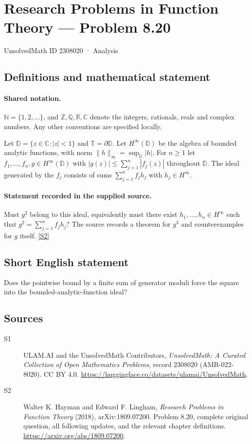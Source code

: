 \documentclass[11pt]{book}
\newcommand{\sref}[2]{\hyperlink{source:#1:#2}{[S#2]}}
\begin{document}
\setcounter{section}{2308019}
\section{Research Problems in Function Theory — Problem 8.20}\label{2308020}
{\small\sffamily UnsolvedMath ID 2308020 · Analysis}
\subsection{Definitions and mathematical statement}

\paragraph{Shared notation.}$\mathbb N=\{1,2,\ldots\}$, and $\mathbb Z,\mathbb Q,\mathbb R,\mathbb C$ denote the integers, rationals, reals and complex numbers. Any other conventions are specified locally.


Let $\mathbb D=\{z\in\mathbb C:|z|<1\}$ and $\mathbb T=\partial\mathbb D$. Let $H^{\infty}(\mathbb D)$ be the algebra of bounded analytic functions, with norm $\|h\|_\infty=\sup_{\mathbb D}|h|$. For $n\ge1$ let $f_1,\ldots,f_n,g\in H^{\infty}(\mathbb D)$ with $|g(z)|\le\sum_{j=1}^n|f_j(z)|$ throughout $\mathbb D$. The ideal generated by the $f_j$ consists of sums $\sum_{j=1}^nf_jh_j$ with $h_j\in H^{\infty}$.
\paragraph{Statement recorded in the supplied source.}
Must $g^2$ belong to this ideal, equivalently must there exist $h_1,\ldots,h_n\in H^{\infty}$ such that $g^2=\sum_{j=1}^nf_jh_j$? The source records a theorem for $g^3$ and counterexamples for $g$ itself. \sref{2308020}{2}
\subsection{Short English statement}
Does the pointwise bound by a finite sum of generator moduli force the square into the bounded-analytic-function ideal?
\subsection{Sources}
\begin{description}
\item[\hypertarget{source:2308020:1}{S1}] ULAM.AI and the UnsolvedMath Contributors, \emph{UnsolvedMath: A Curated Collection of Open Mathematics Problems}, record 2308020 (AMR-022-8020). CC BY 4.0. \url{https://huggingface.co/datasets/ulamai/UnsolvedMath}.
\item[\hypertarget{source:2308020:2}{S2}] Walter K. Hayman and Edward F. Lingham, \emph{Research Problems in Function Theory} (2018), arXiv:1809.07200. Problem 8.20, complete original question, all following updates, and the relevant chapter definitions. \url{https://arxiv.org/abs/1809.07200}.
\end{description}
\label{end:2308020}
\end{document}
